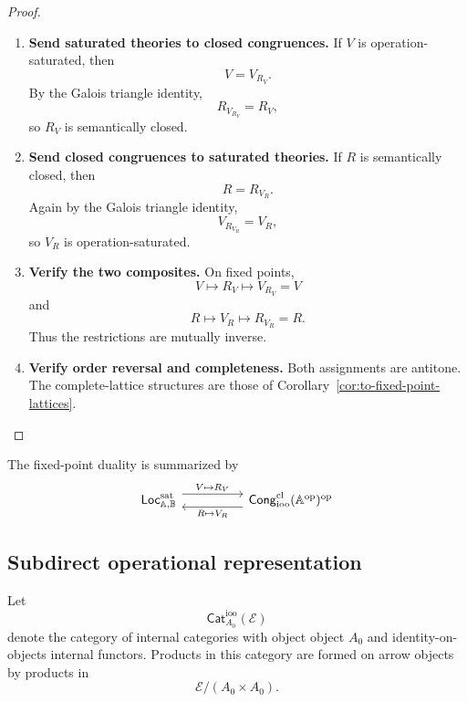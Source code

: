 \begin{proof}
    \leavevmode
    \begin{enumerate}
        \item \textbf{Send saturated theories to closed congruences.}
        If \(V\) is operation-saturated, then
        \[
            V=V_{R_V}.
        \]
        By the Galois triangle identity,
        \[
            R_{V_{R_V}}=R_V,
        \]
        so \(R_V\) is semantically closed.

        \item \textbf{Send closed congruences to saturated theories.}
        If \(R\) is semantically closed, then
        \[
            R=R_{V_R}.
        \]
        Again by the Galois triangle identity,
        \[
            V_{R_{V_R}}=V_R,
        \]
        so \(V_R\) is operation-saturated.

        \item \textbf{Verify the two composites.}
        On fixed points,
        \[
            V\longmapsto R_V\longmapsto V_{R_V}=V
        \]
        and
        \[
            R\longmapsto V_R\longmapsto R_{V_R}=R.
        \]
        Thus the restrictions are mutually inverse.

        \item \textbf{Verify order reversal and completeness.}
        Both assignments are antitone. The complete-lattice structures are
        those of Corollary~\ref{cor:to-fixed-point-lattices}.
    \end{enumerate}
\end{proof}

The fixed-point duality is summarized by
\[
\begin{tikzcd}[column sep=huge]
    \mathsf{Loc}^{\mathrm{sat}}_{\mathbb A,\mathbb B}
        \arrow[r, shift left=1.2ex, "{V\mapsto R_V}"]
    &
    \mathsf{Cong}^{\mathrm{cl}}_{\mathrm{ioo}}
    (\mathbb A^{\mathrm{op}})^{\mathrm{op}}
        \arrow[l, shift left=1.2ex, "{R\mapsto V_R}"]
\end{tikzcd}
\]

\subsection{Subdirect operational representation}
\label{subsec:to-subdirect-operational-representation}

Let
\[
    \mathsf{Cat}_{A_0}^{\mathrm{ioo}}(\mathcal E)
\]
denote the category of internal categories with object object \(A_0\) and
identity-on-objects internal functors. Products in this category are formed
on arrow objects by products in
\[
    \mathcal E/(A_0\times A_0).
\]

